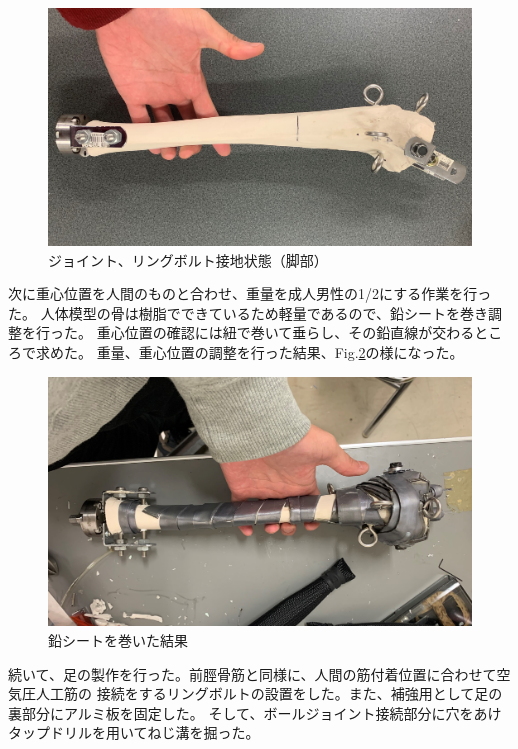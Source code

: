 \begin{figure}[h]
    \begin{center}
     \includegraphics[width=0.6\columnwidth,clip]{./2_measurement/legJoint.eps}
     \caption{ジョイント、リングボルト接地状態（脚部）}
     \label{fig:legJoint}
    \end{center}
\end{figure}
次に重心位置を人間のものと合わせ、重量を成人男性の1/2にする作業を行った。
人体模型の骨は樹脂でできているため軽量であるので、鉛シートを巻き調整を行った。
重心位置の確認には紐で巻いて垂らし、その鉛直線が交わるところで求めた。
重量、重心位置の調整を行った結果、Fig.\ref{fig:legPb}の様になった。

\begin{figure}[h]
    \begin{center}
     \includegraphics[width=0.6\columnwidth,clip]{./2_measurement/legPb.eps}
     \caption{鉛シートを巻いた結果}
     \label{fig:legPb}
    \end{center}
\end{figure}
\newpage
続いて、足の製作を行った。前脛骨筋と同様に、人間の筋付着位置に合わせて空気圧人工筋の
接続をするリングボルトの設置をした。また、補強用として足の裏部分にアルミ板を固定した。
そして、ボールジョイント接続部分に穴をあけタップドリルを用いてねじ溝を掘った。

